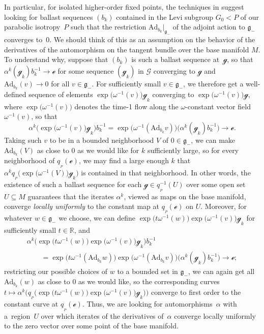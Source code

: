 \documentclass[pdftex]{sigma}
\numberwithin{equation}{section}
\theoremstyle{definition}
\newcommand{\Ad}{\mathrm{Ad}}
\begin{document}
In particular, for isolated higher-order fixed points, the techniques in \cite{CapMelnick2013,MelnickNeusser2016} suggest looking for ballast sequences $(b_k)$ contained in the Levi subgroup $G_0<P$ of our parabolic isotropy~$P$ such that the restriction $\Ad_{b_k}|_{\mathfrak{g}_-}$ of the adjoint action to $\mathfrak{g}_-$ converges to~$0$. We should think of this as an assumption on the behavior of the derivatives of the automorphism on the tangent bundle over the base manifold $M$. To understand why, suppose that $(b_k)$ is such a ballast sequence at~$\mathscr{g}$, so that $\alpha^k(\mathscr{g}_k)b_k^{-1}\rightarrow\mathscr{e}$ for some sequence $(\mathscr{g}_k)$ in $\mathscr{G}$ converging to $\mathscr{g}$ and $\Ad_{b_k}(v)\rightarrow 0$ for all $v\in\mathfrak{g}_-$. For sufficiently small $v\in\mathfrak{g}_-$, we therefore get a well-defined sequence of elements $\exp\bigl(\omega^{-1}(v)\bigr)\mathscr{g}_k$ converging to $\exp\bigl(\omega^{-1}(v)\bigr)\mathscr{g}$, where $\exp\bigl(\omega^{-1}(v)\bigr)$ denotes the time-1 flow along the $\omega$-constant vector field $\omega^{-1}(v)$, so that
\[\alpha^k\bigl(\exp\bigl(\omega^{-1}(v)\bigr)\mathscr{g}_k\bigr)b_k^{-1} =\exp\bigl(\omega^{-1}(\Ad_{b_k}v)\bigr)\bigl(\alpha^k(\mathscr{g}_k)b_k^{-1}\bigr)\rightarrow\mathscr{e}.\]
Taking such $v$ to be in a bounded neighborhood $V$ of $0\in\mathfrak{g}_-$, we can make $\Ad_{b_k}(V)$ as close to $0$ as we would like for $k$ sufficiently large, so for every neighborhood of $q_{{}_P}(\mathscr{e})$, we may find a large enough $k$ that $\alpha^k q_{{}_P}\bigl(\exp\bigl(\omega^{-1}(V)\bigr)\mathscr{g}_k\bigr)$ is contained in that neighborhood. In other words, the existence of such a ballast sequence for each $\mathscr{g}\in q_{{}_P}^{-1}(U)$ over some open set $U\subseteq M$ guarantees that the iterates $\alpha^k$, viewed as maps on the base manifold, converge \textit{locally uniformly} to the constant map at $q_{{}_P}(\mathscr{e})$ on $U$. Moreover, for whatever $w\in\mathfrak{g}_-$ we choose, we can define $\exp\bigl(t\omega^{-1}(w)\bigr)\exp\bigl(\omega^{-1}(v)\bigr)\mathscr{g}_k$ for sufficiently small $t\in\mathbb{R}$, and
\begin{gather*}
\alpha^k\bigl(\exp\bigl(t\omega^{-1}(w)\bigr)\exp\bigl(\omega^{-1}(v)\bigr)\mathscr{g}_k\bigr)b_k^{-1} \\
\qquad =\exp\bigl(t\omega^{-1}(\Ad_{b_k}w)\bigr)\exp\bigl(\omega^{-1}(\Ad_{b_k}v)\bigr) \bigl(\alpha^k(\mathscr{g}_k)b_k^{-1}\bigr)\rightarrow\mathscr{e};
\end{gather*}
restricting our possible choices of $w$ to a bounded set in $\mathfrak{g}_-$, we can again get all $\Ad_{b_k}(w)$ as close to $0$ as we would like, so the corresponding curves $t\mapsto \alpha^k\bigl(q_{{}_P}\bigl(\exp\bigl(t\omega^{-1}(w)\bigr)\exp\bigl(\omega^{-1}(v)\bigr)\mathscr{g}_k\bigr)\bigr)$ converge to first order to the constant curve at $q_{{}_P}(\mathscr{e})$. Thus, we are looking for automorphisms~$\alpha$ with a~region~$U$ over which iterates of the derivatives of~$\alpha$ converge locally uniformly to the zero vector over some point of the base manifold.
\end{document}
